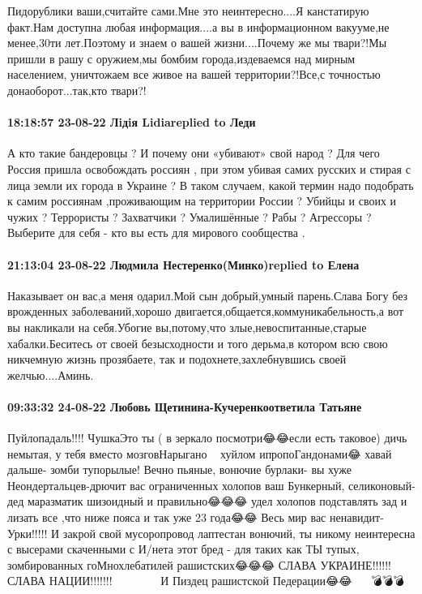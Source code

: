 Пидорублики ваши,считайте сами.Мне это неинтересно....Я канстатирую факт.Нам
доступна любая информация....а вы в информационном вакууме,не менее,30ти
лет.Поэтому и знаем о вашей жизни....Почему же мы твари?!Мы пришли в рашу с
оружием,мы бомбим города,издеваемся над мирным населением, уничтожаем все живое
на вашей территории?!Все,с точностью донаоборот...так,кто твари?!

\paragraph{18:18:57 23-08-22 Лiдiя Lidiareplied to Леди}

А кто такие бандеровцы ? И почему они «убивают» свой народ ? Для чего Россия
пришла освобождать россиян , при этом убивая самих русских   и стирая с лица
земли их города в Украине ? В таком случаем, какой термин надо подобрать к
самим россиянам ,проживающим на территории России ? Убийцы и своих и чужих ?
Террористы ? Захватчики ? Умалишённые ? Рабы ? Агрессоры ? Выберите для себя -
кто вы есть для мирового сообщества .

\paragraph{21:13:04 23-08-22 Людмила Нестеренко(Минко)replied to Елена}

Наказывает он вас,а меня одарил.Мой сын добрый,умный парень.Слава Богу без
врожденных заболеваний,хорошо двигается,общается,коммуникабельность,а вот вы
накликали на себя.Убогие вы,потому,что злые,невоспитанные,старые
хабалки.Беситесь от своей безысходности и того дерьма,в котором всю свою
никчемную жизнь прозябаете, так и подохнете,захлебнувшись своей
желчью....Аминь.

\paragraph{09:33:32 24-08-22 Любовь Щетинина-Кучеренкоответила Татьяне}

Пуйлопадаль!!!! ЧушкаЭто ты ( в зеркало посмотри😂😂если есть таковое) дичь
немытая, у тебя вместо мозговНарыгано🤣😂😅 хуйлом ипропоГандонами😂 хавай
дальше- зомби тупорылые! Вечно пьяные, вонючие бурлаки- вы хуже
Неондертальцев-дрючит вас ограниченных холопов ваш Бункерный, селиконовый-дед
маразматик шизоидный и правильно😂😂😂 удел холопов подставлять зад и лизать
все ,что ниже пояса и так уже 23 года😂😂 Весь мир вас ненавидит- Урки!!!!! И
закрой свой мусоропровод лаптестан вонючий, ты никому неинтересна с высерами
скаченными с И/нета этот бред - для таких как ТЫ тупых, зомбированных
гоМнохлебатилей рашистских😂😂😂 СЛАВА УКРАИНЕ!!!!!! СЛАВА
НАЦИИ!!!!!!!💙💛🌻🌻🌻🌻🌻🌻🌻🌻🌻🌻🌻🌻 И Пиздец рашистской
Педерации😂😂💩💩💩💀💀💀💣💣💣💥💥💥

